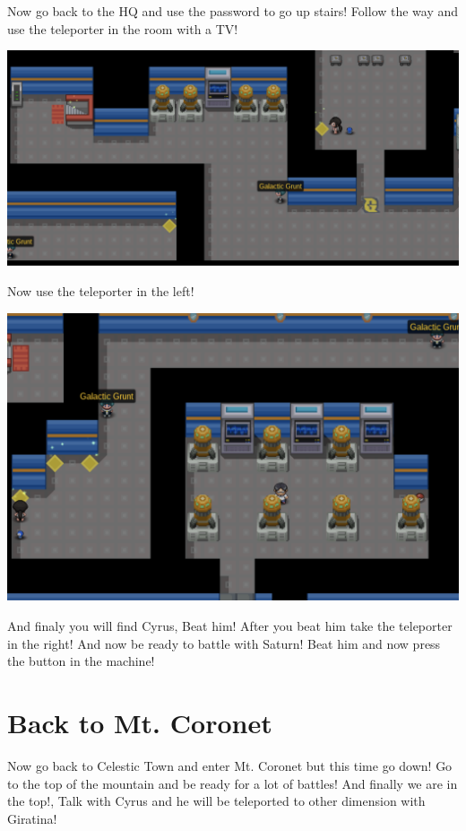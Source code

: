\documentclass[11pt]{article}
\begin{document}
Now go back to the HQ and use the password to go up stairs!
Follow the way and use the teleporter in the room with a TV!

\includegraphics[width=\textwidth]{walkthrough/Sinnoh/galactic-3}

Now use the teleporter in the left!

\includegraphics[width=\textwidth]{walkthrough/Sinnoh/galactic-4}

And finaly you will find Cyrus, Beat him!
After you beat him take the teleporter in the right!
And now be ready to battle with Saturn!
Beat him and now press the button in the machine!

\section{Back to Mt. Coronet}\label{sec:back-to-mt.-coronet}
Now go back to Celestic Town and enter Mt. Coronet but this time go down!
Go to the top of the mountain and be ready for a lot of battles!
And finally we are in the top!, Talk with Cyrus and he will be
teleported to other dimension with Giratina!
\end{document}

